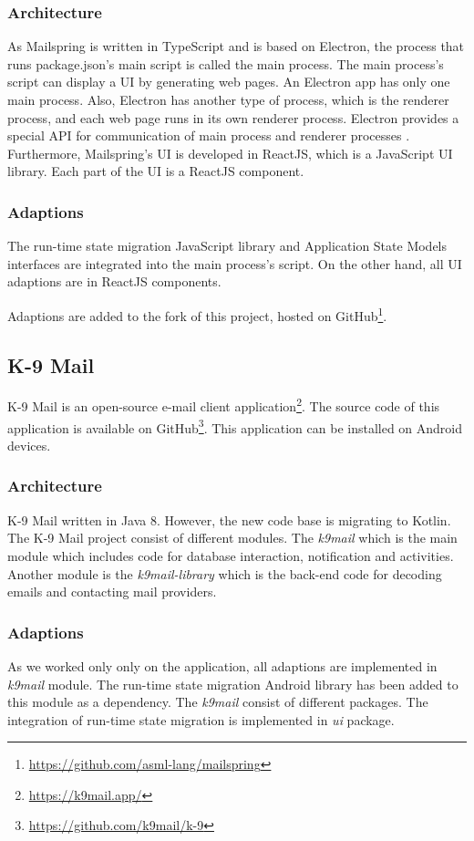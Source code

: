 \subsubsection{Architecture}
As Mailspring is written in TypeScript and is based on Electron, the process that runs package.json's main script is called the main process. The main process's script can display a UI by generating web pages. An Electron app has only one main process. Also, Electron has another type of process, which is the renderer process, and each web page runs in its own renderer process. Electron provides a special API for communication of main process and renderer processes \cite{electron}. Furthermore, Mailspring's UI is developed in ReactJS, which is a JavaScript UI library. Each part of the UI is a ReactJS component.

\subsubsection{Adaptions}
The run-time state migration JavaScript library and Application State Models interfaces are integrated into the main process's script. On the other hand, all UI adaptions are in ReactJS components. 

Adaptions are added to the fork of this project, hosted on GitHub\footnote{\url{https://github.com/asml-lang/mailspring}}. 

\subsection{K-9 Mail}
K-9 Mail is an open-source e-mail client application\footnote{\url{https://k9mail.app/}}. The source code of this application is available on GitHub\footnote{\url{https://github.com/k9mail/k-9}}. This application can be installed on Android devices.

\subsubsection{Architecture}
K-9 Mail written in Java 8. However, the new code base is migrating to Kotlin. The K-9 Mail project consist of different modules. The \textit{k9mail} which is the main module which includes code for database interaction, notification and activities. Another module is the \textit{k9mail-library} which is the back-end code for decoding emails and contacting mail providers. 

\subsubsection{Adaptions}
As we worked only only on the application, all adaptions are implemented in \textit{k9mail} module. The run-time state migration Android library has been added to this module as a dependency. The \textit{k9mail} consist of different packages. The integration of run-time state migration is implemented in \textit{ui} package.

